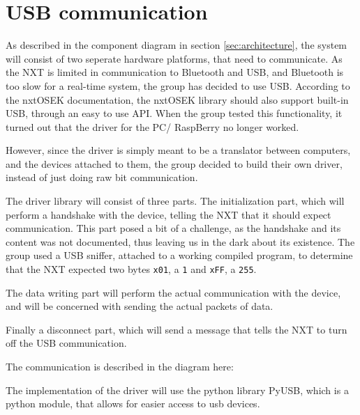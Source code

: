 \section{USB communication}
\label{sec:usb}
As described in the component diagram in section \ref{sec:architecture}, the system will consist of two seperate hardware platforms, that need to communicate.
As the NXT is limited in communication to Bluetooth and USB, and Bluetooth is too slow for a real-time system, the group has decided to use USB.
According to the nxtOSEK documentation, the nxtOSEK library should also support built-in USB, through an easy to use API.
When the group tested this functionality, it turned out that the driver for the PC/ RaspBerry no longer worked.

However, since the driver is simply meant to be a translator between computers, and the devices attached to them, the group decided to build their own driver, instead of just doing raw bit communication.

The driver library will consist of three parts.
The initialization part, which will perform a handshake with the device, telling the NXT that it should expect communication.
This part posed a bit of a challenge, as the handshake and its content was not documented, thus leaving us in the dark about its existence.
The group used a USB sniffer, attached to a working compiled program, to determine that the NXT expected two bytes \texttt{x01}, a \texttt{1} and \texttt{xFF}, a \texttt{255}.

The data writing part will perform the actual communication with the device, and will be concerned with sending the actual packets of data.

Finally a disconnect part, which will send a message that tells the NXT to turn off the USB communication.

The communication is described in the diagram here:


The implementation of the driver will use the python library PyUSB, which is a python module, that allows for easier access to usb devices\cite{PyUSB}.



